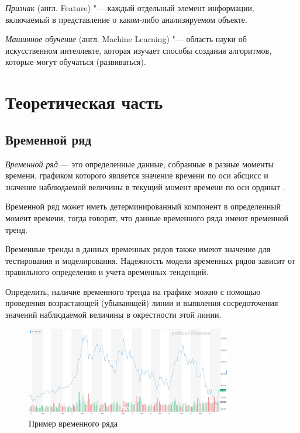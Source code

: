 \documentclass[bachelor, och, coursework]{SCWorks}
\begin{document}
    \textit{Признак} (англ. Feature) "--- каждый отдельный элемент информации,
    включаемый в представление о каком-либо анализируемом объекте.

    \textit{Машинное обучение} (англ. Machine Learning) "--- область науки об
    искусственном интеллекте, которая изучает способы создания алгоритмов,
    которые могут обучаться (развиваться).


\section{Теоретическая часть}

    \subsection{Временной ряд}

        \textit{Временной ряд} — это определенные данные, собранные в разные
        моменты времени, графиком которого является значение времени по оси
        абсцисс и значение наблюдаемой величины в текущий момент времени по оси
        ординат \cite{wei2006time}.

        Временной ряд может иметь детерминированный компонент в определенный
        момент времени, тогда говорят, что данные временного ряда имеют
        временной тренд.
    
        Временные тренды в данных временных рядов также имеют значение для
        тестирования и моделирования. Надежность модели временных рядов зависит
        от правильного определения и учета временных тенденций.
    
        Определить, наличие временного тренда на графике можно с помощью
        проведения возрастающей (убывающей) линии и выявления сосредоточения
        значений наблюдаемой величины в окрестности этой линии.

        \begin{figure}[H]
            \centering
            \includegraphics[width=0.8\textwidth]{pic/timeseries.jpg}
            \caption{Пример временного ряда}
        \end{figure}
\end{document}
